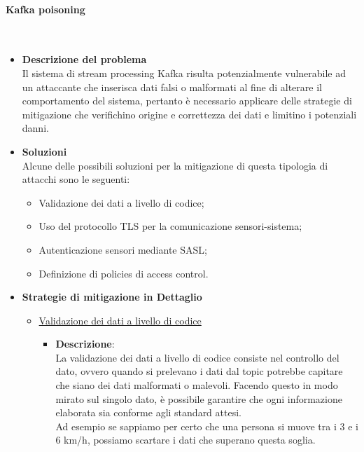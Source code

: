 \documentclass[10pt]{article}
\newcommand{\myparagraph}[1]{\paragraph{#1}\mbox{}\\}
\begin{document}
        \myparagraph{Kafka poisoning}\label{poison}
        \begin{itemize}
            \item \textbf{Descrizione del problema}\\
            Il sistema di stream processing Kafka risulta potenzialmente vulnerabile ad un attaccante che inserisca
            dati falsi o malformati al fine di alterare il comportamento del sistema, pertanto è necessario applicare delle strategie
            di mitigazione che verifichino origine e correttezza dei dati e limitino i potenziali danni.

            \item \textbf{Soluzioni}\\
            Alcune delle possibili soluzioni per la mitigazione di questa tipologia di attacchi sono le seguenti:
            \begin{itemize}
                \item Validazione dei dati a livello di codice;
                \item Uso del protocollo TLS per la comunicazione sensori-sistema;
                \item Autenticazione sensori mediante SASL;
                \item Definizione di policies di access control.
            \end{itemize}

            \item \textbf{Strategie di mitigazione in Dettaglio}
            \begin{itemize}

                \item \underline{Validazione dei dati a livello di codice}
                \begin{itemize}
                    \item \textbf{Descrizione}:\\
                    La validazione dei dati a livello di codice consiste nel controllo del dato, ovvero quando si prelevano i dati dal topic potrebbe capitare che siano dei dati malformati o malevoli.
                    Facendo questo in modo mirato sul singolo dato, è possibile garantire che ogni informazione elaborata sia conforme agli standard attesi. \\
                    Ad esempio se sappiamo per certo che una persona si muove tra i 3 e i 6 km/h, possiamo scartare i dati che superano questa soglia.


\end{itemize}
\end{itemize}
\end{itemize}
\end{document}
